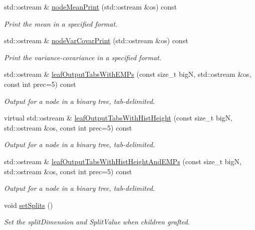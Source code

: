\begin{DoxyCompactItemize}
std\-::ostream \& \hyperlink{classsubpavings_1_1SPSVnode_a768f9507517be618970d19874b1ff992}{node\-Mean\-Print} (std\-::ostream \&os) const 
\begin{DoxyCompactList}\small\item\em \-Print the mean in a specified format. \end{DoxyCompactList}\item 
std\-::ostream \& \hyperlink{classsubpavings_1_1SPSVnode_a096bff1081ceb308590aac8f2f3ee660}{node\-Var\-Covar\-Print} (std\-::ostream \&os) const 
\begin{DoxyCompactList}\small\item\em \-Print the variance-\/covariance in a specified format. \end{DoxyCompactList}\item 
std\-::ostream \& \hyperlink{classsubpavings_1_1SPSVnode_a2ab7acc0aff92694976546f1555f67ed}{leaf\-Output\-Tabs\-With\-E\-M\-Ps} (const size\-\_\-t big\-N, std\-::ostream \&os, const int prec=5) const 
\begin{DoxyCompactList}\small\item\em \-Output for a node in a binary tree, tab-\/delimited. \end{DoxyCompactList}\item 
virtual std\-::ostream \& \hyperlink{classsubpavings_1_1SPSVnode_a6eff83d7095798158c0bc17ee70e54c0}{leaf\-Output\-Tabs\-With\-Hist\-Height} (const size\-\_\-t big\-N, std\-::ostream \&os, const int prec=5) const 
\begin{DoxyCompactList}\small\item\em \-Output for a node in a binary tree, tab-\/delimited. \end{DoxyCompactList}\item 
std\-::ostream \& \hyperlink{classsubpavings_1_1SPSVnode_a4ed4d26826f77814558a0ad3770582f4}{leaf\-Output\-Tabs\-With\-Hist\-Height\-And\-E\-M\-Ps} (const size\-\_\-t big\-N, std\-::ostream \&os, const int prec=5) const 
\begin{DoxyCompactList}\small\item\em \-Output for a node in a binary tree, tab-\/delimited. \end{DoxyCompactList}\item 
void \hyperlink{classsubpavings_1_1SPSVnode_a5d6459ebf84a81b4759a3dd6524df4cf}{set\-Splits} ()
\begin{DoxyCompactList}\small\item\em \-Set the split\-Dimension and \-Split\-Value when children grafted. \end{DoxyCompactList}\end{DoxyCompactItemize}

